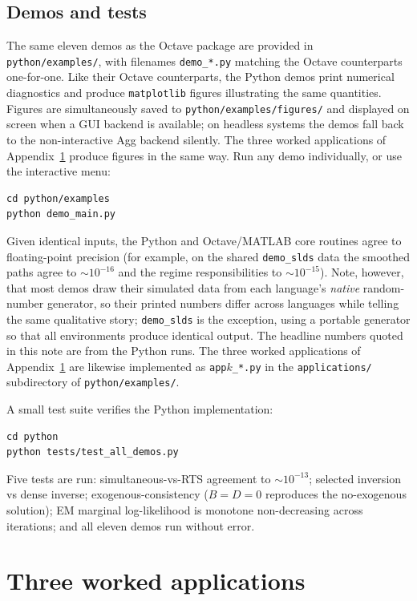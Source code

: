 \documentclass[11pt]{article}
\begin{document}
\subsection{Demos and tests}

The same eleven demos as the Octave package are provided in
\texttt{python/examples/}, with filenames \texttt{demo\_*.py}
matching the Octave counterparts one-for-one.  Like their Octave
counterparts, the Python demos print numerical diagnostics and
produce \texttt{matplotlib} figures illustrating the same
quantities.  Figures are simultaneously saved to
\texttt{python/examples/figures/} and displayed on screen when a
GUI backend is available; on headless systems the demos fall back
to the non-interactive Agg backend silently.  The three worked
applications of Appendix~\ref{sec:apps} produce figures in the
same way.  Run any demo individually, or use the interactive menu:
\begin{lstlisting}
cd python/examples
python demo_main.py
\end{lstlisting}
Given identical inputs, the Python and Octave/MATLAB core routines
agree to floating-point precision (for example, on the shared
\texttt{demo\_slds} data the smoothed paths agree to $\sim 10^{-16}$
and the regime responsibilities to $\sim 10^{-15}$).  Note, however,
that most demos draw their simulated data from each language's
\emph{native} random-number generator, so their printed numbers differ
across languages while telling the same qualitative story;
\texttt{demo\_slds} is the exception, using a portable generator so
that all environments produce identical output.  The headline numbers
quoted in this note are from the Python runs.  The three worked
applications of
Appendix~\ref{sec:apps} are likewise implemented as
\texttt{app$k$\_*.py} in the \texttt{applications/} subdirectory of
\texttt{python/examples/}.

A small test suite verifies the Python implementation:
\begin{lstlisting}
cd python
python tests/test_all_demos.py
\end{lstlisting}
Five tests are run: simultaneous-vs-RTS agreement to $\sim 10^{-13}$;
selected inversion vs dense inverse; exogenous-consistency
($B = D = 0$ reproduces the no-exogenous solution); EM marginal
log-likelihood is monotone non-decreasing across iterations; and all
eleven demos run without error.

\section{Three worked applications}
\label{sec:apps}
\end{document}
